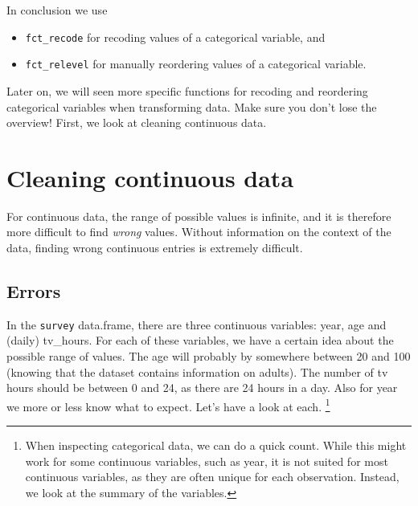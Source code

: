 \documentclass[]{tufte-book}
\newenvironment{Shaded}{}{}
\newcommand{\KeywordTok}[1]{\textcolor[rgb]{0.00,0.44,0.13}{\textbf{#1}}}
\newcommand{\OperatorTok}[1]{\textcolor[rgb]{0.40,0.40,0.40}{#1}}
\newcommand{\NormalTok}[1]{#1}
\providecommand{\tightlist}{%
  \setlength{\itemsep}{0pt}\setlength{\parskip}{0pt}}
\begin{document}
In conclusion we use

\begin{itemize}
\tightlist
\item
  \texttt{fct\_recode} for recoding values of a categorical variable,
  and
\item
  \texttt{fct\_relevel} for manually reordering values of a categorical
  variable.
\end{itemize}

Later on, we will seen more specific functions for recoding and
reordering categorical variables when transforming data. Make sure you
don't lose the overview! First, we look at cleaning continuous data.

\section{Cleaning continuous data}\label{cleaning-continuous-data}

For continuous data, the range of possible values is infinite, and it is
therefore more difficult to find \emph{wrong} values. Without
information on the context of the data, finding wrong continuous entries
is extremely difficult.

\subsection{Errors}\label{errors}

In the \texttt{survey} data.frame, there are three continuous variables:
year, age and (daily) tv\_hours. For each of these variables, we have a
certain idea about the possible range of values. The age will probably
by somewhere between 20 and 100 (knowing that the dataset contains
information on adults). The number of tv hours should be between 0 and
24, as there are 24 hours in a day. Also for year we more or less know
what to expect. Let's have a look at each. \footnote{When inspecting
  categorical data, we can do a quick count. While this might work for
  some continuous variables, such as year, it is not suited for most
  continuous variables, as they are often unique for each observation.
  Instead, we look at the summary of the variables.}

\begin{Shaded}
\end{Shaded}
\end{document}
